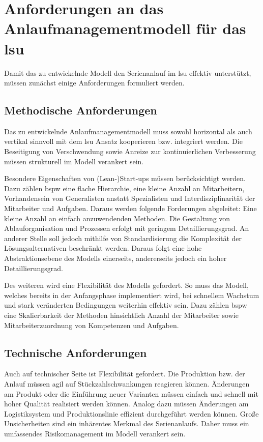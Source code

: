\section{Anforderungen an das Anlaufmanagementmodell für das \gls{lsu}}\label{sec:anforderungen}
Damit das zu entwickelnde Modell den Serienanlauf im \gls{lsu} effektiv unterstützt, müssen zunächst einige Anforderungen formuliert werden. 

\subsection*{Methodische Anforderungen}

Das zu entwickelnde Anlaufmanagementmodell muss sowohl horizontal als auch vertikal sinnvoll mit dem \gls{lsu} Ansatz kooperieren bzw. integriert werden. 
Die Beseitigung von Verschwendung sowie Anreize zur kontinuierlichen Verbesserung müssen strukturell im Modell verankert sein. 

Besondere Eigenschaften von (Lean-)Start-ups müssen berücksichtigt werden. Dazu zählen \gls{bspw} eine flache Hierarchie, eine kleine Anzahl an Mitarbeitern, Vorhandensein von Generalisten anstatt Spezialisten und Interdisziplinarität der Mitarbeiter und Aufgaben. Daraus werden folgende Forderungen abgeleitet: Eine kleine Anzahl an einfach anzuwendenden Methoden. Die Gestaltung von Ablauforganisation und Prozessen erfolgt mit geringem Detaillierungsgrad. An anderer Stelle soll jedoch mithilfe von Standardisierung die Komplexität der Lösungsalternativen beschränkt werden. Daraus folgt eine hohe Abstraktionsebene des Modells einerseits, andererseits jedoch ein hoher Detaillierungsgrad. 

Des weiteren wird eine Flexibilität des Modells gefordert. So muss das Modell, welches bereits in der Anfangsphase implementiert wird, bei schnellem Wachstum und stark veränderten Bedingungen weiterhin effektiv sein. Dazu zählen \gls{bspw} eine Skalierbarkeit der Methoden hinsichtlich Anzahl der Mitarbeiter sowie Mitarbeiterzuordnung von Kompetenzen und Aufgaben. 

\subsection*{Technische Anforderungen}

Auch auf technischer Seite ist Flexibilität gefordert. Die Produktion bzw. der Anlauf müssen agil auf Stückzahlschwankungen reagieren können. Änderungen am Produkt oder die Einführung neuer Varianten müssen einfach und schnell mit hoher Qualität realisiert werden können. Analog dazu müssen Änderungen am Logistiksystem und Produktionslinie effizient durchgeführt werden können. 
Große Unsicherheiten sind ein inhärentes Merkmal des Serienanlaufs. Daher muss ein umfassendes Risikomanagement im Modell verankert sein. 

